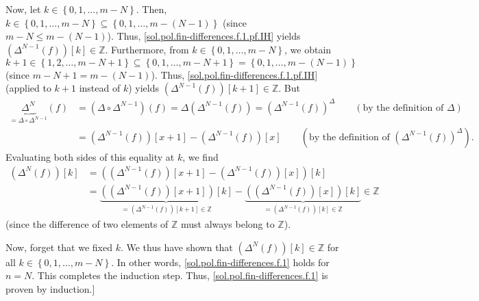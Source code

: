 \documentclass[paper=a4, fontsize=12pt]{scrartcl}%
\theoremstyle{plainsl}
\theoremstyle{definition}
\theoremstyle{remark}
\begin{document}
Now, let $k\in\left\{  0,1,\ldots,m-N\right\}  $. Then, $k\in\left\{
0,1,\ldots,m-N\right\}  \subseteq\left\{  0,1,\ldots,m-\left(  N-1\right)
\right\}  $ (since $m-N\leq m-\left(  N-1\right)  $). Thus,
\eqref{sol.pol.fin-differences.f.1.pf.IH} yields $\left(  \Delta^{N-1}\left(
f\right)  \right)  \left[  k\right]  \in\mathbb{Z}$. Furthermore, from
$k\in\left\{  0,1,\ldots,m-N\right\}  $, we obtain
\[
k+1\in\left\{  1,2,\ldots,m-N+1\right\}  \subseteq\left\{  0,1,\ldots
,m-N+1\right\}  =\left\{  0,1,\ldots,m-\left(  N-1\right)  \right\}
\]
(since $m-N+1=m-\left(  N-1\right)  $). Thus,
\eqref{sol.pol.fin-differences.f.1.pf.IH} (applied to $k+1$ instead of $k$)
yields $\left(  \Delta^{N-1}\left(  f\right)  \right)  \left[  k+1\right]
\in\mathbb{Z}$. But
\begin{align*}
\underbrace{\Delta^{N}}_{=\Delta\circ\Delta^{N-1}}\left(  f\right)   &
=\left(  \Delta\circ\Delta^{N-1}\right)  \left(  f\right)  =\Delta\left(
\Delta^{N-1}\left(  f\right)  \right)  =\left(  \Delta^{N-1}\left(  f\right)
\right)  ^{\Delta}\qquad\left(  \text{by the definition of }\Delta\right) \\
&  =\left(  \Delta^{N-1}\left(  f\right)  \right)  \left[  x+1\right]
-\left(  \Delta^{N-1}\left(  f\right)  \right)  \left[  x\right]
\qquad\left(  \text{by the definition of }\left(  \Delta^{N-1}\left(
f\right)  \right)  ^{\Delta}\right)  .
\end{align*}
Evaluating both sides of this equality at $k$, we find%
\begin{align*}
\left(  \Delta^{N}\left(  f\right)  \right)  \left[  k\right]   &  =\left(
\left(  \Delta^{N-1}\left(  f\right)  \right)  \left[  x+1\right]  -\left(
\Delta^{N-1}\left(  f\right)  \right)  \left[  x\right]  \right)  \left[
k\right] \\
&  =\underbrace{\left(  \left(  \Delta^{N-1}\left(  f\right)  \right)  \left[
x+1\right]  \right)  \left[  k\right]  }_{=\left(  \Delta^{N-1}\left(
f\right)  \right)  \left[  k+1\right]  \in\mathbb{Z}}-\underbrace{\left(
\left(  \Delta^{N-1}\left(  f\right)  \right)  \left[  x\right]  \right)
\left[  k\right]  }_{=\left(  \Delta^{N-1}\left(  f\right)  \right)  \left[
k\right]  \in\mathbb{Z}}\in\mathbb{Z}%
\end{align*}
(since the difference of two elements of $\mathbb{Z}$ must always belong to
$\mathbb{Z}$).

Now, forget that we fixed $k$. We thus have shown that $\left(  \Delta
^{N}\left(  f\right)  \right)  \left[  k\right]  \in\mathbb{Z}$ for all
$k\in\left\{  0,1,\ldots,m-N\right\}  $. In other words,
\eqref{sol.pol.fin-differences.f.1} holds for $n=N$. This completes the
induction step. Thus, \eqref{sol.pol.fin-differences.f.1} is proven by induction.]
\end{document}
